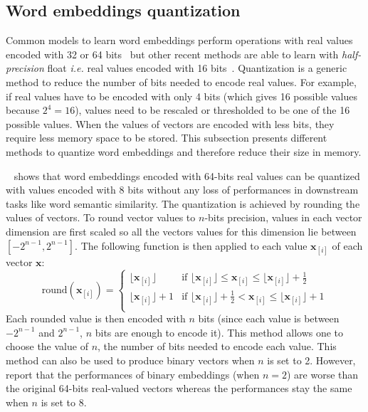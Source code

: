   \subsection{Word embeddings quantization}
    \label{ch04:subsec:quantization}
    Common models to learn word embeddings perform operations with real values
    encoded with 32 or 64 bits~\citep{mikolov2013distributed,
    pennington2014glove} but other recent methods are able to learn with
    \textit{half-precision} float \textit{i.e.} real values encoded with 16
    bits~\citep{micikevicius2018mixed, seznec2018study}. Quantization is a
    generic method to reduce the number of bits needed to encode real values.
    For example, if real values have to be encoded with only 4 bits (which gives
    16 possible values because $2^4 = 16$), values need to be rescaled or
    thresholded to be one of the 16 possible values. When the values of vectors
    are encoded with less bits, they require less memory space to be stored.
    This subsection presents different methods to quantize word embeddings and
    therefore reduce their size in memory.\medskip

    \citeauthor{ling2016word}~\citep{ling2016word} shows that word embeddings
    encoded with 64-bits real values can be quantized with values encoded with 8
    bits without any loss of performances in downstream tasks like word semantic
    similarity. The quantization is achieved by rounding the values of vectors.
    To round vector values to $n$-bits precision, values in each vector
    dimension are first scaled so all the vectors values for this dimension lie
    between $[-2^{n-1}, 2^{n-1}]$. The following function is then applied to
    each value $\mathbf{x}_{[i]}$ of each vector $\mathbf{x}$:
    \[
      \text{round}(\mathbf{x}_{[i]}) =
      \begin{cases}
        \lfloor \mathbf{x}_{[i]} \rfloor & \text{if }
          \lfloor \mathbf{x}_{[i]} \rfloor \leq \mathbf{x}_{[i]} \leq
          \lfloor \mathbf{x}_{[i]} \rfloor + \frac{1}{2}\\
        \lfloor \mathbf{x}_{[i]} \rfloor + 1 & \text{if }
          \lfloor \mathbf{x}_{[i]} \rfloor + \frac{1}{2} < \mathbf{x}_{[i]} \leq
          \lfloor \mathbf{x}_{[i]} \rfloor + 1\\
      \end{cases}
    \]
    Each rounded value is then encoded with $n$ bits (since each value is
    between $-2^{n-1}$ and $2^{n-1}$, $n$ bits are enough to encode it). This
    method allows one to choose the value of $n$, the number of bits needed to
    encode each value. This method can also be used to produce binary vectors
    when $n$ is set to 2. However,~\citeauthor{ling2016word} report that the
    performances of binary embeddings (when $n=2$) are worse than the original
    64-bits real-valued vectors whereas the performances stay the same when $n$
    is set to 8.\medskip

